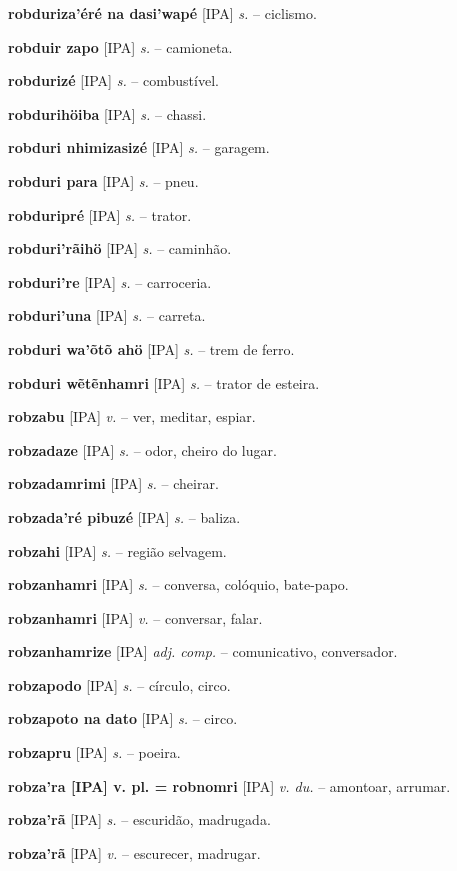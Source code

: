 \textbf{robduriza'éré na dasi'wapé} [IPA] \textit{s.} -- ciclismo.

\textbf{robduir zapo} [IPA] \textit{s.} -- camioneta.

\textbf{robdurizé} [IPA] \textit{s.} -- combustível.

\textbf{robdurihöiba} [IPA] \textit{s.} -- chassi.

\textbf{robduri nhimizasizé} [IPA] \textit{s.} -- garagem.

\textbf{robduri para} [IPA] \textit{s.} -- pneu.

\textbf{robduripré} [IPA] \textit{s.} -- trator.

\textbf{robduri'rãihö} [IPA] \textit{s.} -- caminhão.

\textbf{robduri're} [IPA] \textit{s.} -- carroceria.

\textbf{robduri'una} [IPA] \textit{s.} -- carreta.

\textbf{robduri wa'õtõ ahö} [IPA] \textit{s.} -- trem de ferro.

\textbf{robduri wẽtẽnhamri} [IPA] \textit{s.} -- trator de esteira.

\textbf{robzabu} [IPA] \textit{v.} -- ver, meditar, espiar.

\textbf{robzadaze} [IPA] \textit{s.} -- odor, cheiro do lugar.

\textbf{robzadamrimi} [IPA] \textit{s.} -- cheirar.

\textbf{robzada'ré pibuzé} [IPA] \textit{s.} -- baliza.

\textbf{robzahi} [IPA] \textit{s.} -- região selvagem.

\textbf{robzanhamri} [IPA] \textit{s.} -- conversa, colóquio, bate-papo.

\textbf{robzanhamri} [IPA] \textit{v.} -- conversar, falar.

\textbf{robzanhamrize} [IPA] \textit{adj. comp.} -- comunicativo, conversador.

\textbf{robzapodo} [IPA] \textit{s.} -- círculo, circo.

\textbf{robzapoto na dato} [IPA] \textit{s.} -- circo.

\textbf{robzapru} [IPA] \textit{s.} -- poeira.

\textbf{robza'ra [IPA] v. pl. = robnomri} [IPA] \textit{v. du.} -- amontoar, arrumar.

\textbf{robza'rã} [IPA] \textit{s.} -- escuridão, madrugada.

\textbf{robza'rã} [IPA] \textit{v.} -- escurecer, madrugar.

